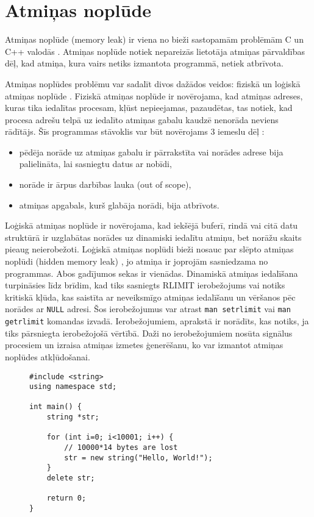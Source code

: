 ﻿\section{Atmiņas noplūde}


Atmiņas noplūde (memory leak) ir viena no bieži sastopamām problēmām C un C++ valodās \cite{atparv}.
Atmiņas noplūde notiek nepareizās lietotāja atmiņas pārvaldības dēļ, kad atmiņa, kura vairs netiks izmantota programmā, netiek atbrīvota.

Atmiņas noplūdes problēmu var sadalīt divos dažādos veidos: fiziskā un loģiskā atmiņas noplūde \cite{JMMR}.
Fiziskā atmiņas noplūde ir novērojama, kad atmiņas adreses, kuras tika iedalītas procesam,  kļūst nepieejamas, pazaudētas, tas notiek, kad procesa adrešu telpā uz iedalīto atmiņas gabalu kaudzē nenorāda neviens rādītājs.
Šīs programmas stāvoklis var būt novērojams 3 iemeslu dēļ \cite{JMMR}:
\begin{itemize}
\item pēdēja norāde uz atmiņas gabalu ir pārrakstīta vai norādes adrese bija palielināta, lai sasniegtu datus ar nobīdi,
\item norāde ir ārpus darbības lauka (out of scope),
\item atmiņas apgabals, kurš glabāja norādi, bija atbrīvots.
\end{itemize}

Loģiskā atmiņas noplūde ir novērojama, kad iekšējā buferī, rindā vai citā datu struktūrā ir uzglabātas norādes uz dinamiski iedalītu atmiņu, bet norāžu skaits pieaug neierobežoti.
Loģiskā atmiņas noplūdi bieži nosauc par slēpto atmiņas noplūdi (hidden memory leak) \cite{RRUU}, jo atmiņa ir joprojām sasniedzama no programmas.
Abos gadījumos sekas ir vienādas. 
Dinamiskā atmiņas iedalīšana turpināsies līdz brīdim, kad  tiks sasniegts RLIMIT ierobežojums vai notiks kritiskā kļūda, kas saistīta ar neveiksmīgo atmiņas iedalīšanu un vēršanos pēc norādes ar \texttt{NULL} adresi.
Šos ierobežojumus var atrast \texttt{man setrlimit} vai \texttt{man getrlimit} komandas izvadā. 
Ierobežojumiem, aprakstā ir norādīts, kas notiks, ja tiks pārsniegta ierobežojošā vērtībā.
Daži no ierobežojumiem nosūta signālus procesiem un izraisa atmiņas izmetes ģenerēšanu, ko var izmantot atmiņas noplūdes atkļūdošanai.
\begin{figure}[h]
\begin{lstlisting}
#include <string>
using namespace std;

int main() {
    string *str;

    for (int i=0; i<10001; i++) {
        // 10000*14 bytes are lost
        str = new string("Hello, World!");
    }
    delete str;

    return 0;
}
\end{lstlisting}
\caption{\textbf{\fontsize{11}{12}\selectfont {Atmiņas noplūde, C++}}}
\end{figure}

